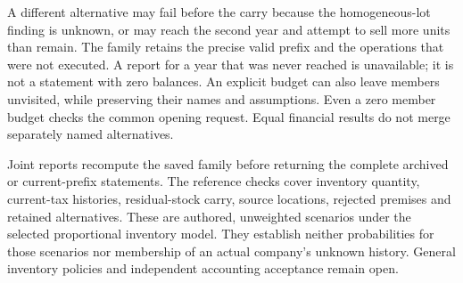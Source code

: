 A different alternative may fail before the carry because the homogeneous-lot
finding is unknown, or may reach the second year and attempt to sell more units
than remain.  The family retains the precise valid prefix and the operations
that were not executed.  A report for a year that was never reached is
unavailable; it is not a statement with zero balances.  An explicit budget can
also leave members unvisited, while preserving their names and assumptions.
Even a zero member budget checks the common opening request.  Equal financial
results do not merge separately named alternatives.

Joint reports recompute the saved family before returning the complete archived
or current-prefix statements.  The reference checks cover inventory quantity,
current-tax histories, residual-stock carry, source locations, rejected premises
and retained alternatives.  These are authored, unweighted scenarios under the
selected proportional inventory model.  They establish neither probabilities
for those scenarios nor membership of an actual company's unknown history.
General inventory policies and independent accounting acceptance remain open.
